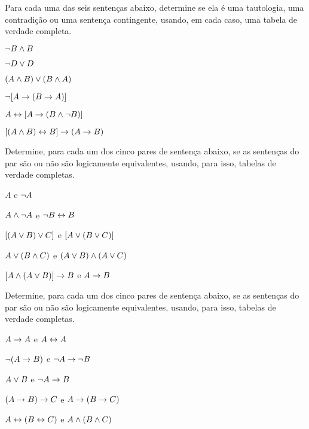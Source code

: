 \problempart Para cada uma das seis sentenças abaixo, determine se ela é uma tautologia, uma contradição ou uma sentença contingente, usando, em cada caso, uma tabela de verdade completa.
\begin{earg}
\item $\neg B \wedge B$ \vspace{.5ex}%


\item $\neg D \vee D$ \vspace{.5ex}%


\item $(A\wedge B) \vee (B\wedge A)$\vspace{.5ex} %


\item $\neg[A \rightarrow (B \rightarrow A)]$\vspace{.5ex} %


\item $A \leftrightarrow [A \rightarrow (B \wedge \neg B)]$ \vspace{.5ex}%


\item $[(A \wedge B) \leftrightarrow B] \rightarrow (A \rightarrow B)$ \vspace{.5ex}%

\end{earg}



\noindent\problempart
\label{pr.TT.equiv}
Determine, para cada um dos cinco pares de sentença abaixo, se as sentenças do par são ou não são logicamente equivalentes, usando, para isso, tabelas de verdade completas.
\begin{earg}
\item $A$ e $\neg A$
\item $A \wedge \neg A$ e $\neg B \leftrightarrow B$
\item $[(A \vee B) \vee C]$ e $[A \vee (B \vee C)]$
\item $A \vee (B \wedge C)$ e $(A \vee B) \wedge (A \vee C)$
\item $[A \wedge (A \vee B)] \rightarrow B$ e $A \rightarrow B$\end{earg}


\problempart
\label{pr.TT.equiv2}
Determine, para cada um dos cinco pares de sentença abaixo, se as sentenças do par são ou não são logicamente equivalentes, usando, para isso, tabelas de verdade completas.
\begin{earg}
\item $A\rightarrow A$ e $A \leftrightarrow A$
\item $\neg(A \rightarrow B)$ e $\neg A \rightarrow \neg B$
\item $A \vee B$ e $\neg A \rightarrow B$
\item$(A \rightarrow B) \rightarrow C$ e $A \rightarrow (B \rightarrow C)$
\item $A \leftrightarrow (B \leftrightarrow C)$ e $A \wedge (B \wedge C)$
\end{earg}


